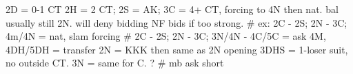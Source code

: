 2D = 0-1 CT
2H = 2 CT; 2S = AK; 3C = 4+ CT, forcing to 4N
    then nat. bal usually still 2N. will deny bidding NF bids if too strong.
    # ex: 2C - 2S; 2N - 3C; 4m/4N = nat, slam forcing
    # 2C - 2S; 2N - 3C; 3N/4N - 4C/5C = ask 4M, 4DH/5DH = transfer
2N = KKK
    then same as 2N opening
3DHS = 1-loser suit, no outside CT. 3N = same for C.
    ?  # mb ask short
